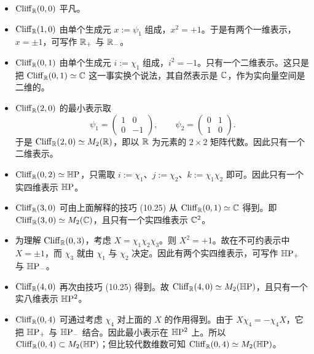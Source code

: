 \begin{itemize}[leftmargin=1.6em,itemsep=1pt,topsep=2pt]
\item $\mathrm{Cliff}_{\mathbb{R}}(0,0)$ 平凡。
\item $\mathrm{Cliff}_{\mathbb{R}}(1,0)$ 由单个生成元 $x:=\psi_1$ 组成，$x^2=+1$。于是有两个一维表示，$x=\pm1$，可写作 $\mathbb{R}_+$ 与 $\mathbb{R}_-$。
\item $\mathrm{Cliff}_{\mathbb{R}}(0,1)$ 由单个生成元 $i:=\chi_1$ 组成，$i^2=-1$。只有一个二维表示。这只是把 $\mathrm{Cliff}_{\mathbb{R}}(0,1)\simeq\mathbb{C}$ 这一事实换个说法，其自然表示是 $\mathbb{C}$，作为实向量空间是二维的。
\item $\mathrm{Cliff}_{\mathbb{R}}(2,0)$ 的最小表示取
\begin{equation}
  \psi_1=\begin{pmatrix}1&0\\0&-1\end{pmatrix},\qquad
  \psi_2=\begin{pmatrix}0&1\\1&0\end{pmatrix}.
  \tag{10.26}
\end{equation}
于是 $\mathrm{Cliff}_{\mathbb{R}}(2,0)\simeq M_2(\mathbb{R})$，即以 $\mathbb{R}$ 为元素的 $2\times2$ 矩阵代数。因此只有一个二维表示。
\item $\mathrm{Cliff}_{\mathbb{R}}(0,2)\simeq\mathbb{H}\mathrm{P}$，只需取 $i:=\chi_1$、$j:=\chi_2$、$k:=\chi_1\chi_2$ 即可。因此只有一个实四维表示 $\mathbb{H}\mathrm{P}$。
\item $\mathrm{Cliff}_{\mathbb{R}}(3,0)$ 可由上面解释的技巧 (10.25) 从 $\mathrm{Cliff}_{\mathbb{R}}(0,1)\simeq\mathbb{C}$ 得到。即 $\mathrm{Cliff}_{\mathbb{R}}(3,0)\simeq M_2(\mathbb{C})$，且只有一个实四维表示 $\mathbb{C}^2$。
\item 为理解 $\mathrm{Cliff}_{\mathbb{R}}(0,3)$，考虑 $X=\chi_1\chi_2\chi_3$。则 $X^2=+1$。故在不可约表示中 $X=\pm1$，而 $\chi_3$ 就由 $\chi_1$ 与 $\chi_2$ 决定。因此有两个实四维表示，可写作 $\mathbb{H}\mathrm{P}_+$ 与 $\mathbb{H}\mathrm{P}_-$。
\item $\mathrm{Cliff}_{\mathbb{R}}(4,0)$ 再次由技巧 (10.25) 得到。故 $\mathrm{Cliff}_{\mathbb{R}}(4,0)\simeq M_2(\mathbb{H}\mathrm{P})$，且只有一个实八维表示 $\mathbb{H}\mathrm{P}^2$。
\item $\mathrm{Cliff}_{\mathbb{R}}(0,4)$ 可通过考虑 $\chi_4$ 对上面的 $X$ 的作用得到。由于 $X\chi_4=-\chi_4X$，它把 $\mathbb{H}\mathrm{P}_+$ 与 $\mathbb{H}\mathrm{P}_-$ 结合。因此最小表示在 $\mathbb{H}\mathrm{P}^2$ 上。所以 $\mathrm{Cliff}_{\mathbb{R}}(0,4)\subset M_2(\mathbb{H}\mathrm{P})$；但比较代数维数可知 $\mathrm{Cliff}_{\mathbb{R}}(0,4)\simeq M_2(\mathbb{H}\mathrm{P})$。
\end{itemize}

